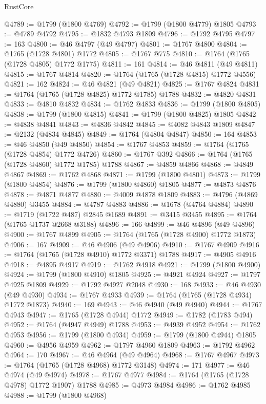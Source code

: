 \begin{lexlean}{RustCore}
\begin{coremodule}
@4789 := @1799 (@1800 @4769)
@4792 := @1799 (@1800 @4779) @1805
@4793 := @4789 @4792
@4795 := @1832 @4793 @1809
@4796 := @1792 @4795
@4797 := 163
@4800 := @46 @4797 (@49 @4797)
@4801 := @1767 @4800
@4804 := @1765 (@1728 @4801) @1772
@4805 := @1767 @775
@4810 := @1764 (@1765 (@1728 @4805) @1772 @1775)
@4811 := 161
@4814 := @46 @4811 (@49 @4811)
@4815 := @1767 @4814
@4820 := @1764 (@1765 (@1728 @4815) @1772 @4556)
@4821 := 162
@4824 := @46 @4821 (@49 @4821)
@4825 := @1767 @4824
@4831 := @1764 (@1765 (@1728 @4825) @1772 @1785) @1788
@4832 := @4820 @4831
@4833 := @4810 @4832
@4834 := @1762 @4833
@4836 := @1799 (@1800 @4805)
@4838 := @1799 (@1800 @4815)
@4841 := @1799 (@1800 @4825) @1805
@4842 := @4838 @4841
@4843 := @4836 @4842
@4845 := @4082 @4843 @1809
@4847 := @2132 (@4834 @4845)
@4849 := @1764 (@4804 @4847)
@4850 := 164
@4853 := @46 @4850 (@49 @4850)
@4854 := @1767 @4853
@4859 := @1764 (@1765 (@1728 @4854) @1772 @4726)
@4860 := @1767 @392
@4866 := @1764 (@1765 (@1728 @4860) @1772 @1785) @1788
@4867 := @4859 @4866
@4868 := @4849 @4867
@4869 := @1762 @4868
@4871 := @1799 (@1800 @4801)
@4873 := @1799 (@1800 @4854)
@4876 := @1799 (@1800 @4860) @1805
@4877 := @4873 @4876
@4878 := @4871 @4877
@4880 := @4009 @4878 @1809
@4883 := @4796 (@4869 @4880) @3455
@4884 := @4787 @4883
@4886 := @1678 (@4764 @4884)
@4890 := @1719 (@1722 @487) @2845 @1689
@4891 := @3415 @3455
@4895 := @1764 (@1765 @1737 @2668 @3188)
@4896 := 166
@4899 := @46 @4896 (@49 @4896)
@4900 := @1767 @4899
@4905 := @1764 (@1765 (@1728 @4900) @1772 @1873)
@4906 := 167
@4909 := @46 @4906 (@49 @4906)
@4910 := @1767 @4909
@4916 := @1764 (@1765 (@1728 @4910) @1772 @3371) @1788
@4917 := @4905 @4916
@4918 := @4895 @4917
@4919 := @1762 @4918
@4921 := @1799 (@1800 @4900)
@4924 := @1799 (@1800 @4910) @1805
@4925 := @4921 @4924
@4927 := @1797 @4925 @1809
@4929 := @1792 @4927 @2048
@4930 := 168
@4933 := @46 @4930 (@49 @4930)
@4934 := @1767 @4933
@4939 := @1764 (@1765 (@1728 @4934) @1772 @1873)
@4940 := 169
@4943 := @46 @4940 (@49 @4940)
@4944 := @1767 @4943
@4947 := @1765 (@1728 @4944) @1772
@4949 := @1782 (@1783 @494)
@4952 := @1764 (@4947 @4949) @1788
@4953 := @4939 @4952
@4954 := @1762 @4953
@4956 := @1799 (@1800 @4934)
@4959 := @1799 (@1800 @4944) @1805
@4960 := @4956 @4959
@4962 := @1797 @4960 @1809
@4963 := @1792 @4962
@4964 := 170
@4967 := @46 @4964 (@49 @4964)
@4968 := @1767 @4967
@4973 := @1764 (@1765 (@1728 @4968) @1772 @3148)
@4974 := 171
@4977 := @46 @4974 (@49 @4974)
@4978 := @1767 @4977
@4984 := @1764 (@1765 (@1728 @4978) @1772 @1907) @1788
@4985 := @4973 @4984
@4986 := @1762 @4985
@4988 := @1799 (@1800 @4968)

\end{coremodule}
\end{lexlean}
